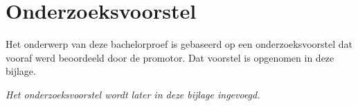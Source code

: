 \documentclass[dutch,dit,thesis]{hogentreport}
\begin{document}
    
    
    
    
    
    
    
    
    
    
    
    
    \appendix
    
    \chapter{Onderzoeksvoorstel}
    
    Het onderwerp van deze bachelorproef is gebaseerd op een onderzoeksvoorstel dat vooraf werd beoordeeld door de promotor. Dat voorstel is opgenomen in deze bijlage.
    
   
        {%
            \textit{Het onderzoeksvoorstel wordt later in deze bijlage ingevoegd.}%
        }%
    
    
    
    
    
    
    
    
    \backmatter{}
    
    \setlength\bibitemsep{2pt} %
    \nocite{*}
    \printbibliography[heading=bibintoc]
    
\end{document}
